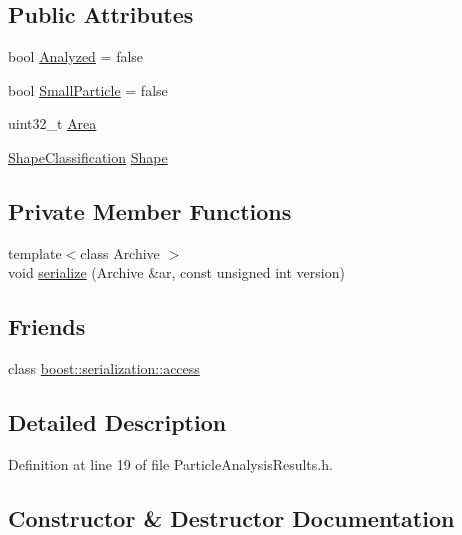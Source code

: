 \subsection*{Public Attributes}
\begin{DoxyCompactItemize}
\item 
bool \hyperlink{class_soil_analyzer_1_1_particle_analysis_results_abfb8465c0cfbe9a6ad4d844f6269676f}{Analyzed} = false
\item 
bool \hyperlink{class_soil_analyzer_1_1_particle_analysis_results_a8aaa7f053d68bce6f1ad2b7bcd30cd95}{Small\+Particle} = false
\item 
uint32\+\_\+t \hyperlink{class_soil_analyzer_1_1_particle_analysis_results_a1a6dbe8880b29f51ba3d8ec28b96ed45}{Area}
\item 
\hyperlink{class_shape_classification}{Shape\+Classification} \hyperlink{class_soil_analyzer_1_1_particle_analysis_results_a75230aa0675b2df489c08bcfffb43b97}{Shape}
\end{DoxyCompactItemize}
\subsection*{Private Member Functions}
\begin{DoxyCompactItemize}
\item 
{\footnotesize template$<$class Archive $>$ }\\void \hyperlink{class_soil_analyzer_1_1_particle_analysis_results_a89c11362f5cb934006c6d67d1b51eef4}{serialize} (Archive \&ar, const unsigned int version)
\end{DoxyCompactItemize}
\subsection*{Friends}
\begin{DoxyCompactItemize}
\item 
class \hyperlink{class_soil_analyzer_1_1_particle_analysis_results_ac98d07dd8f7b70e16ccb9a01abf56b9c}{boost\+::serialization\+::access}
\end{DoxyCompactItemize}


\subsection{Detailed Description}


Definition at line 19 of file Particle\+Analysis\+Results.\+h.



\subsection{Constructor \& Destructor Documentation}
\hypertarget{class_soil_analyzer_1_1_particle_analysis_results_a5107ea5aae70deadb77ab22c2429f7f6}{}
